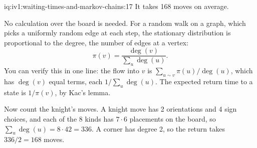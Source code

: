 \begin{solution}{iq:iv1:waiting-times-and-markov-chains:17}
It takes 168 moves on average.

No calculation over the board is needed. For a random walk on a graph, which picks a uniformly random edge at each step, the stationary distribution is proportional to the degree, the number of edges at a vertex:
\[
\pi(v) = \frac{\deg(v)}{\sum_u \deg(u)}.
\]
You can verify this in one line: the flow into $v$ is $\sum_{u \sim v} \pi(u)/\deg(u)$, which has $\deg(v)$ equal terms, each $1/\sum_u \deg(u)$. The expected return time to a state is $1/\pi(v)$, by Kac's lemma.

Now count the knight's moves. A knight move has 2 orientations and 4 sign choices, and each of the 8 kinds has $7 \cdot 6$ placements on the board, so $\sum_u \deg(u) = 8 \cdot 42 = 336$. A corner has degree 2, so the return takes $336/2 = 168$ moves.

\end{solution}

